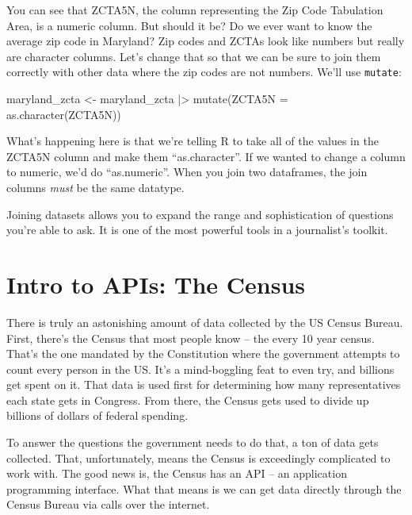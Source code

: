 \documentclass[
  letterpaper,
  DIV=11,
  numbers=noendperiod]{scrreprt}
\newenvironment{Shaded}{\begin{snugshade}}{\end{snugshade}}
\newcommand{\AttributeTok}[1]{\textcolor[rgb]{0.40,0.45,0.13}{#1}}
\newcommand{\FunctionTok}[1]{\textcolor[rgb]{0.28,0.35,0.67}{#1}}
\newcommand{\NormalTok}[1]{\textcolor[rgb]{0.00,0.23,0.31}{#1}}
\newcommand{\OtherTok}[1]{\textcolor[rgb]{0.00,0.23,0.31}{#1}}
\newcommand{\SpecialCharTok}[1]{\textcolor[rgb]{0.37,0.37,0.37}{#1}}
\begin{document}
You can see that ZCTA5N, the column representing the Zip Code Tabulation
Area, is a numeric column. But should it be? Do we ever want to know the
average zip code in Maryland? Zip codes and ZCTAs look like numbers but
really are character columns. Let's change that so that we can be sure
to join them correctly with other data where the zip codes are not
numbers. We'll use \texttt{mutate}:

\begin{Shaded}
\begin{Highlighting}[]
\NormalTok{maryland\_zcta }\OtherTok{\textless{}{-}}\NormalTok{ maryland\_zcta }\SpecialCharTok{|\textgreater{}} \FunctionTok{mutate}\NormalTok{(}\AttributeTok{ZCTA5N =} \FunctionTok{as.character}\NormalTok{(ZCTA5N))}
\end{Highlighting}
\end{Shaded}

What's happening here is that we're telling R to take all of the values
in the ZCTA5N column and make them ``as.character''. If we wanted to
change a column to numeric, we'd do ``as.numeric''. When you join two
dataframes, the join columns \emph{must} be the same datatype.

Joining datasets allows you to expand the range and sophistication of
questions you're able to ask. It is one of the most powerful tools in a
journalist's toolkit.


\hypertarget{intro-to-apis-the-census}{%
\chapter{Intro to APIs: The Census}\label{intro-to-apis-the-census}}

There is truly an astonishing amount of data collected by the US Census
Bureau. First, there's the Census that most people know -- the every 10
year census. That's the one mandated by the Constitution where the
government attempts to count every person in the US. It's a
mind-boggling feat to even try, and billions get spent on it. That data
is used first for determining how many representatives each state gets
in Congress. From there, the Census gets used to divide up billions of
dollars of federal spending.

To answer the questions the government needs to do that, a ton of data
gets collected. That, unfortunately, means the Census is exceedingly
complicated to work with. The good news is, the Census has an API -- an
application programming interface. What that means is we can get data
directly through the Census Bureau via calls over the internet.
\end{document}
